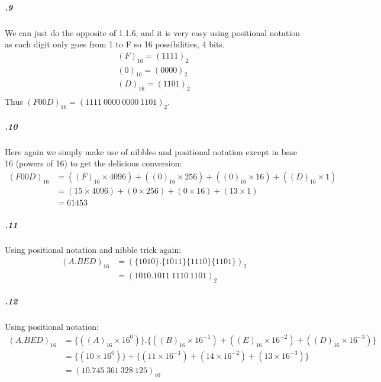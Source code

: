 \documentclass[11pt,letterpaper]{article}
\begin{document}
		\subparagraph{.9}
		We can just do the opposite of 1.1.6, and it is very easy using positional notation as each digit only goes from 1 to F so 16 possibilities, 4 bits.
		\begin{align*}
		(F)_{16} = (1111)_2\\
		(0)_{16} = (0000)_2\\
		(D)_{16} = (1101)_2\\
		\end{align*}
		Thus $(F00D)_{16} = (1111\ 0000\ 0000\ 1101)_2$.
		
		\subparagraph{.10}
		Here again we simply make use of nibbles and positional notation except in base 16 (powers of 16) to get the delicious conversion:
		\begin{align*}
		(F00D)_16 &= ((F)_{16} \times 4096) + ((0)_{16} \times 256) + ((0)_{16} \times 16) + ((D)_{16} \times 1)\\
		&= (15 \times 4096) + (0 \times 256) + (0 \times 16) + (13 \times 1)\\
		&= 61 453
		\end{align*}
		
		\subparagraph{.11}
		Using positional notation and nibble trick again:
		\begin{align*}
		(A.BED)_{16} &= (\{1010\}.\{1011\}\{1110\}\{1101\})_{2}\\
		&= (1010.1011\ 1110\ 1101)_{2}
		\end{align*}
		
		\subparagraph{.12}
		Using positional notation:
		\begin{align*}
		(A.BED)_{16} &= \{((A)_{16} \times 16^0)\} . \{((B)_{16} \times 16^{-1}) + ((E)_{16} \times 16^{-2}) + ((D)_{16} \times 16^{-3})\}\\
		&= \{(10 \times 16^0)\} + \{(11 \times 16^{-1}) + (14 \times 16^{-2}) + (13 \times 16^{-3})\}\\
		&= (10.745\ 361\ 328\ 125)_{10}
		\end{align*}
		
	\section{}
	
\end{document}
